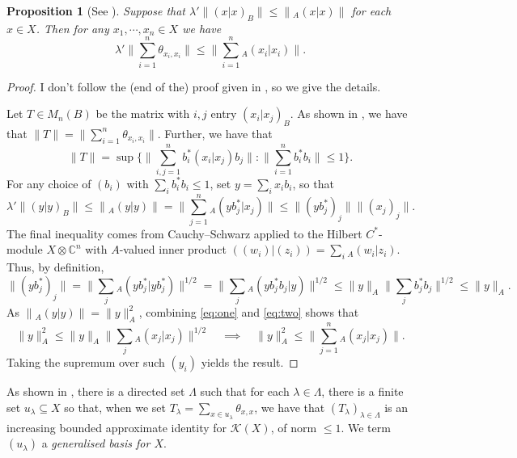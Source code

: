 \documentclass[a4paper,11pt]{article}
\theoremstyle{plain}
\newtheorem{proposition}{Proposition}[section]
\theoremstyle{remark}
\newcommand{\mc}[1]{\mathcal{#1}}
\begin{document}
\begin{proposition}[{See \cite[Proposition~2.4]{KPW_JonesIndexTheory}}]\label{prop:lower_ineq_sums}
Suppose that $\lambda' \|(x|x)_B\| \leq \|{}_A(x|x)\|$ for each $x\in X$.  Then for any $x_1,\cdots,x_n\in X$ we have
\[ \lambda' \Big\| \sum_{i=1}^n \theta_{x_i,x_i} \Big\| \leq 
\Big\| \sum_{i=1}^n {}_A(x_i|x_i) \Big\|. \]
\end{proposition}
\begin{proof}
I don't follow the (end of the) proof given in \cite{KPW_JonesIndexTheory}, so we give the details.

Let $T\in M_n(B)$ be the matrix with $i,j$ entry $(x_i|x_j)_B$.  As shown in \cite[Lemma~2.1]{KPW_CStarHilbertBimods}, we have that $\|T\| = \| \sum_{i=1}^n \theta_{x_i,x_i} \|$.  Further, we have that
\[ \|T\| = \sup\Big\{ \Big\|\sum_{i,j=1}^n b_i^* (x_i|x_j) b_j \Big\| : \Big\| \sum_{i=1}^n b_i^*b_i \Big\| \leq 1 \Big\}. \]
For any choice of $(b_i)$ with $\sum_i b_i^*b_i \leq 1$, set $y = \sum_i x_i b_i$, so that
\begin{equation} \label{eq:one}
\lambda' \|(y|y)_B\| \leq \| {}_A (y|y) \| = \Big\| \sum_{j=1}^n {}_A(y b_j^* | x_j) \Big \|
\leq \big\| (y b_j^*)_j \big\| \big\| (x_j)_j \big\|.
\end{equation}
The final inequality comes from Cauchy--Schwarz applied to the Hilbert $C^*$-module $X \otimes \mathbb C^n$ with $A$-valued inner product $((w_i)|(z_i)) = \sum_i {}_A(w_i|z_i)$.  Thus, by definition,
\begin{equation} \label{eq:two}
\big\| (y b_j^*)_j \big\| = \Big\| \sum_j {}_A(yb_j^*|yb_j^*) \Big\|^{1/2}
= \Big\| \sum_j {}_A(yb_j^*b_j|y) \Big\|^{1/2}
\leq \|y\|_A \Big\| \sum_j b_j^*b_j \Big\|^{1/2} \leq \|y\|_A.
\end{equation}
As $\|{}_A(y|y)\| = \|y\|_A^2$, combining \eqref{eq:one} and \eqref{eq:two} shows that
\[ \|y\|_A^2 \leq \|y\|_A \Big\| \sum_j {}_A(x_j|x_j) \Big\|^{1/2}
\quad \implies \quad \|y\|_A^2 \leq \Big\| \sum_{j=1}^n {}_A(x_j|x_j) \Big\|. \]
Taking the supremum over such $(y_i)$ yields the result.
\end{proof}

As shown in \cite[Proposition~1.4]{KPW_JonesIndexTheory}, there is a directed set $\Lambda$ such that for each $\lambda\in\Lambda$, there is a finite set $u_\lambda \subseteq X$ so that, when we set $T_\lambda = \sum_{x\in u_\lambda} \theta_{x,x}$, we have that $(T_\lambda)_{\lambda\in\Lambda}$ is an increasing bounded approximate identity for $\mc K(X)$, of norm $\leq 1$.  We term $(u_\lambda)$ a \emph{generalised basis for $X$}.
\end{document}
